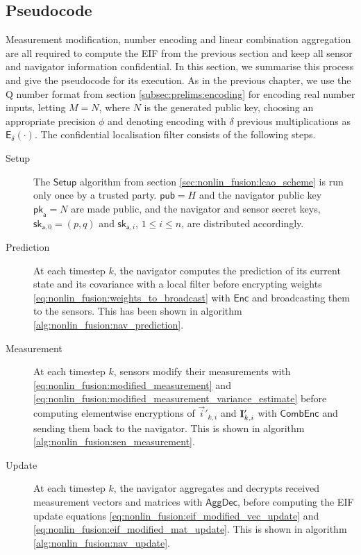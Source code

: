 \subsection{Pseudocode}\label{subsec:nonlin_fusion:pseudocode}
Measurement modification, number encoding and linear combination aggregation are all required to compute the EIF from the previous section and keep all sensor and navigator information confidential. In this section, we summarise this process and give the pseudocode for its execution. As in the previous chapter, we use the  Q number format from section \ref{subsec:prelims:encoding} for encoding real number inputs, letting $M=N$, where $N$ is the generated public key, choosing an appropriate precision $\phi$ and denoting encoding with $\delta$ previous multiplications as $\mathsf{E}_{\delta}(\cdot)$. The confidential localisation filter consists of the following steps.
\begin{description}
    \item[Setup] The $\mathsf{Setup}$ algorithm from section \ref{sec:nonlin_fusion:lcao_scheme} is run only once by a trusted party. $\mathsf{pub}=H$ and the navigator public key $\mathsf{pk}_{\mathsf{a}}=N$ are made public, and the navigator and sensor secret keys, $\mathsf{sk}_{\mathsf{a},0}=(p, q)$ and $\mathsf{sk}_{\mathsf{a}, i}$, $1\leq i\leq n$, are distributed accordingly.

    \item[Prediction] At each timestep $k$, the navigator computes the prediction of its current state and its covariance with a local filter before encrypting weights \eqref{eq:nonlin_fusion:weights_to_broadcast} with $\mathsf{Enc}$ and broadcasting them to the sensors. This has been shown in algorithm \ref{alg:nonlin_fusion:nav_prediction}.

    \item[Measurement] At each timestep $k$, sensors modify their measurements with \eqref{eq:nonlin_fusion:modified_measurement} and \eqref{eq:nonlin_fusion:modified_measurement_variance_estimate} before computing elementwise encryptions of $\vec{i}'_{k, i}$ and ${{\mathbf{I}}}'_{k, i}$ with $\mathsf{CombEnc}$ and sending them back to the navigator. This is shown in algorithm \ref{alg:nonlin_fusion:sen_measurement}.

    \item[Update] At each timestep $k$, the navigator aggregates and decrypts received measurement vectors and matrices with $\mathsf{AggDec}$, before computing the EIF update equations \eqref{eq:nonlin_fusion:eif_modified_vec_update} and \eqref{eq:nonlin_fusion:eif_modified_mat_update}. This is shown in algorithm \ref{alg:nonlin_fusion:nav_update}.
\end{description}

